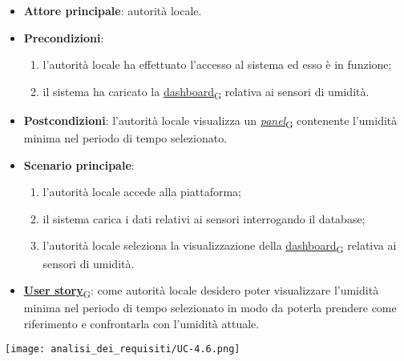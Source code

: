 \begin{itemize}
	\item \textbf{Attore principale}: autorità locale.
	\item \textbf{Precondizioni}:
	      \begin{enumerate}
		      \item l'autorità locale ha effettuato l'accesso al sistema ed esso è in funzione;
		      \item il sistema ha caricato la \href{https://7last.github.io/docs/pb/documentazione-interna/glossario\#dashboard}{dashboard\textsubscript{G}} relativa ai sensori di umidità.
	      \end{enumerate}
	\item \textbf{Postcondizioni}: l'autorità locale visualizza un \href{https://7last.github.io/docs/pb/documentazione-interna/glossario\#panel}{\textit{panel}\textsubscript{G}} contenente l'umidità minima nel periodo di tempo selezionato.
	\item \textbf{Scenario principale}:
	      \begin{enumerate}
		      \item l'autorità locale accede alla piattaforma;
		      \item il sistema carica i dati relativi ai sensori interrogando il database;
		      \item l'autorità locale seleziona la visualizzazione della \href{https://7last.github.io/docs/pb/documentazione-interna/glossario\#dashboard}{dashboard\textsubscript{G}} relativa ai sensori di umidità.
	      \end{enumerate}
	\item \href{https://7last.github.io/docs/pb/documentazione-interna/glossario\#user-story}{\textbf{User story}\textsubscript{G}}:
	      come autorità locale desidero poter visualizzare l'umidità minima nel periodo di tempo selezionato
	      in modo da poterla prendere come riferimento e confrontarla con l'umidità attuale.
\end{itemize}
\begin{center}
	\texttt{[image: analisi\_dei\_requisiti/UC-4.6.png]}
\end{center}

